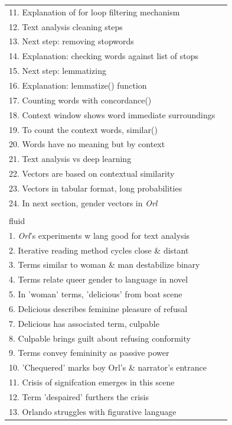 \documentclass[11pt]{article}
\begin{document}
\begin{center}
\begin{tabular}{ll}
11. Explanation of for loop filtering mechanism & \\[0pt]
12. Text analysis cleaning steps & \\[0pt]
13. Next step: removing stopwords & \\[0pt]
14. Explanation: checking words against list of stops & \\[0pt]
15. Next step: lemmatizing & \\[0pt]
16. Explanation: lemmatize() function & \\[0pt]
17. Counting words with concordance() & \\[0pt]
18. Context window shows word immediate surroundings & \\[0pt]
19. To count the context words, similar() & \\[0pt]
20. Words have no meaning but by context & \\[0pt]
21. Text analysis vs deep learning & \\[0pt]
22. Vectors are based on contextual similarity & \\[0pt]
23. Vectors in tabular format, long probabilities & \\[0pt]
24. In next section, gender vectors in \emph{Orl} & \\[0pt]
 & \\[0pt]
fluid & \\[0pt]
1. \emph{Orl}'s experiments w lang good for text analysis & \\[0pt]
2. Iterative reading method cycles close \& distant & \\[0pt]
3. Terms similar to woman \& man destabilize binary & \\[0pt]
4. Terms relate queer gender to language in novel & \\[0pt]
5. In 'woman' terms, 'delicious' from boat scene & \\[0pt]
6. Delicious describes feminine pleasure of refusal & \\[0pt]
7. Delicious has associated term, culpable & \\[0pt]
8. Culpable brings guilt about refusing conformity & \\[0pt]
9. Terms convey femininity as passive power & \\[0pt]
10. 'Chequered' marks boy Orl's \&  narrator's entrance & \\[0pt]
11. Crisis of signifcation emerges in this scene & \\[0pt]
12. Term 'despaired' furthers the crisis & \\[0pt]
13. Orlando struggles with figurative language & \\[0pt]

\end{tabular}
\end{center}
\end{document}
